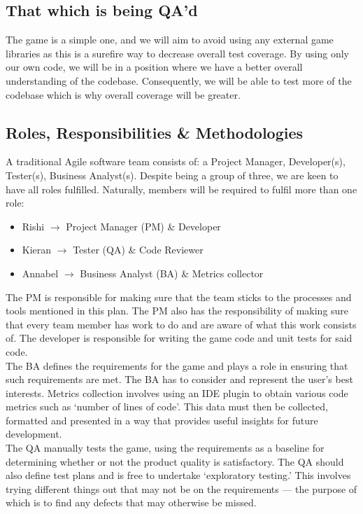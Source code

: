 \documentclass[12pt]{article}
\begin{document}
 \subsection{That which is being QA'd}
 The game is a simple one, and we will aim to avoid using any external game libraries as this is a surefire way to decrease overall test coverage. By using only our own code, we will be in a position where we have a better overall understanding of the codebase. Consequently, we will be able to test more of the codebase which is why overall coverage will be greater.
 
 \subsection{Roles, Responsibilities \& Methodologies}
 A traditional Agile software team consists of: a Project Manager, Developer(s), Tester(s), Business Analyst(s). Despite being a group of three, we are keen to have all roles fulfilled. Naturally, members will be required to fulfil more than one role:
 
 \begin{itemize}
     \item Rishi $\longrightarrow$ Project Manager (PM) \& Developer
     \item Kieran $\longrightarrow$ Tester (QA) \& Code Reviewer
     \item Annabel $\longrightarrow$ Business Analyst (BA) \& Metrics collector
 \end{itemize}
 
The PM is responsible for making sure that the team sticks to the processes and tools mentioned in this plan. The PM also has the responsibility of making sure that every team member has work to do and are aware of what this work consists of. The developer is responsible for writing the game code and unit tests for said code. \\
 
The BA defines the requirements for the game and plays a role in ensuring that such requirements are met. The BA has to consider and represent the user's best interests. Metrics collection involves using an IDE plugin to obtain various code metrics such as `number of lines of code'. This data must then be collected, formatted and presented in a way that provides useful insights for future development. \\
 
The QA manually tests the game, using the requirements as a baseline for determining whether or not the product quality is satisfactory. The QA should also define test plans and is free to undertake `exploratory testing.' This involves trying different things out that may not be on the requirements --- the purpose of which is to find any defects that may otherwise be missed. \\
\end{document}
